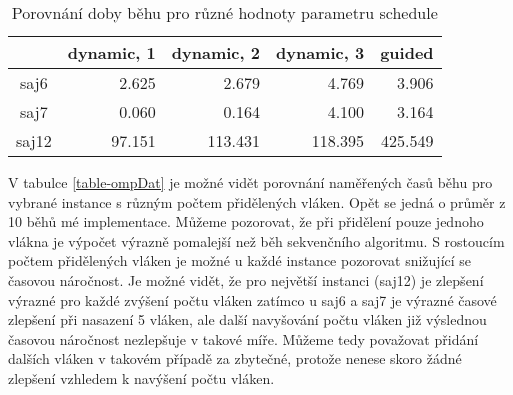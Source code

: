 \documentclass{article} \oddsidemargin=-5mm
\begin{document}
\begin{table}[h]
\centering
\begin{tabular}{|c|r|r|r|r|}
\hline
\rowcolor[HTML]{C0C0C0} 
\multicolumn{1}{|l|}{\cellcolor[HTML]{C0C0C0}\textbf{Název instance}} & \multicolumn{1}{l|}{\cellcolor[HTML]{C0C0C0}\textbf{dynamic, 1}} & \multicolumn{1}{l|}{\cellcolor[HTML]{C0C0C0}\textbf{dynamic, 2}} & \multicolumn{1}{l|}{\cellcolor[HTML]{C0C0C0}\textbf{dynamic, 3}} & \multicolumn{1}{l|}{\cellcolor[HTML]{C0C0C0}\textbf{guided}} \\ \hline
saj6                                                            & 2.625                                                            & 2.679                                                            & 4.769                                                            & 3.906                                                        \\ \hline
saj7                                                            & 0.060                                                           & 0.164                                                            & 4.100                                                              & 3.164                                                        \\ \hline
saj12                                                           & 97.151                                                           & 113.431                                                          & 118.395                                                          & 425.549                                                      \\ \hline
\end{tabular}
\caption{Porovnání doby běhu pro různé hodnoty parametru schedule}
\label{table-ompDat-schedule}
\end{table}

V tabulce \ref{table-ompDat} je možné vidět porovnání naměřených časů běhu pro vybrané instance s různým počtem přidělených vláken. Opět se jedná o průměr z 10 běhů mé implementace. Můžeme pozorovat, že při přidělení pouze jednoho vlákna je výpočet výrazně pomalejší než běh sekvenčního algoritmu. S rostoucím počtem přidělených vláken je možné u každé instance pozorovat snižující se časovou náročnost. Je možné vidět, že pro největší instanci (saj12) je zlepšení výrazné pro každé zvýšení počtu vláken zatímco u saj6 a saj7 je výrazné časové zlepšení při nasazení 5 vláken, ale další navyšování počtu vláken již výslednou časovou náročnost nezlepšuje v takové míře. Můžeme tedy považovat přidání dalších vláken v takovém případě za zbytečné, protože nenese skoro žádné zlepšení vzhledem k navýšení počtu vláken.
\end{document}

